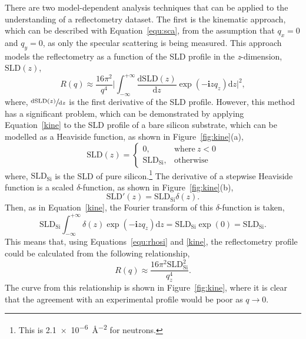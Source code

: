 There are two model-dependent analysis techniques that can be applied to the understanding of a reflectometry dataset.
The first is the kinematic approach, which can be described with Equation~\ref{equ:sca}, from the assumption that $q_x = 0$ and $q_y = 0$, as only the specular scattering is being measured.
This approach models the reflectometry as a function of the SLD profile in the \emph{z}-dimension, $\text{SLD}(z)$,
%
\begin{equation}
    R(q) \approx \frac{16\pi^2}{q^4}\bigg|\int_{-\infty}^{+\infty}\frac{\text{d}\text{SLD}(z)}{\text{d}z}\exp{(-\mathbf{i}zq_z)}\text{d}z\bigg|^2,
    \label{kine}
\end{equation}
%
where, $\sfrac{\text{d}\text{SLD}(z)}{\text{d}z}$ is the first derivative of the SLD profile.
However, this method has a significant problem, which can be demonstrated by applying Equation~\ref{kine} to the SLD profile of a bare silicon substrate, which can be modelled as a Heaviside function, as shown in Figure~\ref{fig:kine}(a),
%
\begin{equation}
    \text{SLD}(z) =
  \begin{cases}
    0, & \text{where}\ z < 0 \\
    \text{SLD}_{\text{Si}}, & \text{otherwise}
  \end{cases}
\end{equation}
%
where, $\text{SLD}_{\text{Si}}$ is the SLD of pure silicon.\footnote{This is \SI{2.1e-6}{\angstrom^{-2}} for neutrons.}
The derivative of a stepwise Heaviside function is a scaled $\delta$-function, as shown in Figure~\ref{fig:kine}(b),
%
\begin{equation}
    \text{SLD}'(z) = \text{SLD}_{\text{Si}}\delta(z).
\end{equation}
%
Then, as in Equation~\ref{kine}, the Fourier transform of this $\delta$-function is taken,
%
\begin{equation}
    \text{SLD}_{\text{Si}}\int_{-\infty}^{+\infty}\delta(z)\exp{(-\mathbf{i}zq_z)}\text{d}z = \text{SLD}_{\text{Si}}\exp(0) = \text{SLD}_{\text{Si}}.
    \label{equ:rhosi}
\end{equation}
%
This means that, using Equations~\ref{equ:rhosi} and \ref{kine}, the reflectometry profile could be calculated from the following relationship,
%
\begin{equation}
    R(q)\approx \frac{16\pi^2\text{SLD}_{\text{Si}}^2}{q_z^4}.
\end{equation}
%
The curve from this relationship is shown in Figure~\ref{fig:kine}, where it is clear that the agreement with an experimental profile would be poor as $q \rightarrow 0$.
